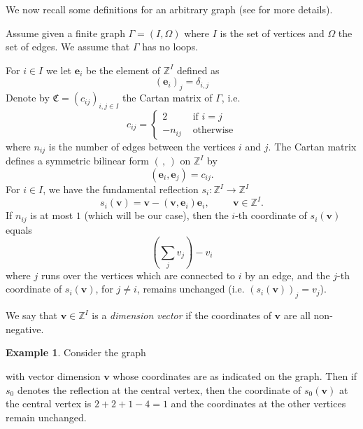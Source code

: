 \documentclass[11pt]{article}
\theoremstyle{definition}
\newtheorem{exam}[theo]{Example}
\numberwithin{equation}{section}
\newcommand{\bv}{{\mathbf{v}}}
\newcommand{\be}{{\mathbf{e}}}
\newcommand{\Z}{{\mathbb{Z}}}
\begin{document}
 


We now recall some definitions for an arbitrary graph (see \cite[Chapter 5]{kac} for more details).

Assume given a finite graph $\Gamma=(I,\Omega)$ where $I$ is the set of vertices and $\Omega$ the set of edges. We assume that $\Gamma$ has no loops.

For $i\in I$ we let $\be_i$ be the element of $\Z^I$ defined as 
$$
(\be_i)_j=\delta_{i,j}
$$
Denote by ${\mathfrak C}=(c_{ij})_{i,j\in I}$ the Cartan matrix of $\Gamma$, i.e.
$$
c_{ij}=\begin{cases}2 &\text{ if } i=j \\
	-n_{ij}&\text{ otherwise}\end{cases}
$$
where $n_{ij}$ is the number of edges between the vertices $i$ and $j$. The Cartan matrix defines a symmetric bilinear form $(\,,\,)$ on $\Z^I$ by
$$
(\be_i,\be_j)=c_{ij}.
$$
For $i\in I$, we have the fundamental reflection $s_i:\Z^I\rightarrow\Z^I$
$$
s_i(\bv)=\bv-(\bv,\be_i)\be_i,\hspace{1cm}\bv\in\Z^I.
$$
If $n_{ij}$ is at most $1$ (which will be our case), then the $i$-th coordinate of $s_i(\bv)$ equals 
$$
(\sum_j v_j)-v_i
$$
where $j$ runs over the vertices which are connected to $i$ by an edge, and the $j$-th coordinate of $s_i(\bv)$, for $j\neq i$, remains unchanged (i.e. $(s_i(\bv))_j=v_j$).


We say that $\bv\in\Z^I$ is a \emph{dimension vector} if the coordinates of $\bv$ are all non-negative.





\begin{exam}Consider the graph
	{\footnotesize{
			\begin{center}
	\end{center}}}
	\noindent with vector dimension $\bv$ whose coordinates are as indicated on the graph. Then if $s_0$ denotes the reflection at the central vertex, then the coordinate of $s_0(\bv)$ at the central vertex is $2+2+1-4=1$ and the coordinates at the other vertices remain unchanged.
	\label{exD4}\end{exam}
\end{document}
